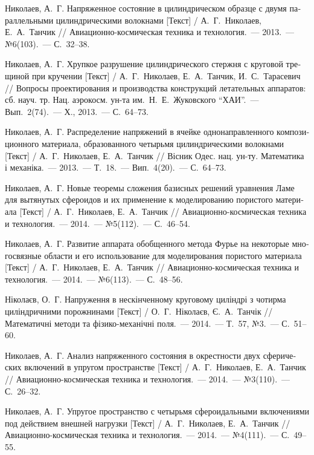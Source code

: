 \begin{russian}
\begin{biblist}{99}
Николаев, А.~Г. 
Напряженное состояние в цилиндрическом образце с двумя параллельными цилиндрическими волокнами [Текст] 
/ А.~Г.~Николаев, Е.~А.~Танчик 
// Авиационно-космическая техника и технология.~--- 2013.~--- №6(103).~--- С.~32--38.

Николаев, А.~Г. 
Хрупкое разрушение цилиндрического стержня с круговой трещиной при кручении [Текст] 
/ А.~Г.~Николаев, Е.~А.~Танчик, И.~С.~Тарасевич 
// Вопросы проектирования и производства конструкций летательных аппаратов: сб. науч. тр. Нац. аэрокосм. ун-та им.~Н.~Е.~Жуковского ``ХАИ''.~--- Вып.~2(74).~--- Х., 2013.~--- С.~64--73.

Николаев, А.~Г. 
Распределение напряжений в ячейке однонаправленного композиционного материала, образованного четырьмя цилиндрическими волокнами [Текст] / А.~Г.~Николаев, Е.~А.~Танчик 
// Вісник Одес. нац. ун-ту. Математика і механіка.~--- 2013.~--- Т.~18.~--- Вип.~4(20).~--- С.~64--73.

Николаев, А.~Г. 
Новые теоремы сложения базисных решений уравнения Ламе для вытянутых сфероидов и их применение к моделированию пористого материала [Текст] 
/ А.~Г.~Николаев, Е.~А.~Танчик 
// Авиационно-космическая техника и технология.~--- 2014.~--- №5(112).~--- С.~46--54.

Николаев, А.~Г. 
Развитие аппарата обобщенного метода Фурье на некоторые многосвязные области и его использование для моделирования пористого материала [Текст] 
/ А.~Г.~Николаев, Е.~А.~Танчик 
// Авиационно-космическая техника и технология.~--- 2014.~--- №6(113).~--- С.~48--56.

Ніколаєв, О.~Г. 
Напруження в нескінченному круговому циліндрі з чотирма циліндричними порожнинами [Текст] 
/ О.~Г.~Ніколаєв, Є.~А.~Танчік 
// Математичні методи та фізико-механічні поля.~--- 2014.~--- Т.~57, №3.~--- С.~51--60.

Николаев, А.~Г. 
Анализ напряженного состояния в окрестности двух сферических включений в упругом пространстве [Текст] 
/ А.~Г.~Николаев, Е.~А.~Танчик 
// Авиационно-космическая техника и технология.~--- 2014.~--- №3(110).~--- С.~26--32.

Николаев, А.~Г. 
Упругое пространство с четырьмя сфероидальными включениями под действием внешней нагрузки [Текст] 
/ А.~Г.~Николаев, Е.~А.~Танчик 
// Авиационно-космическая техника и технология.~--- 2014.~--- №4(111).~--- С.~49--55.


\end{biblist}
\end{russian}
